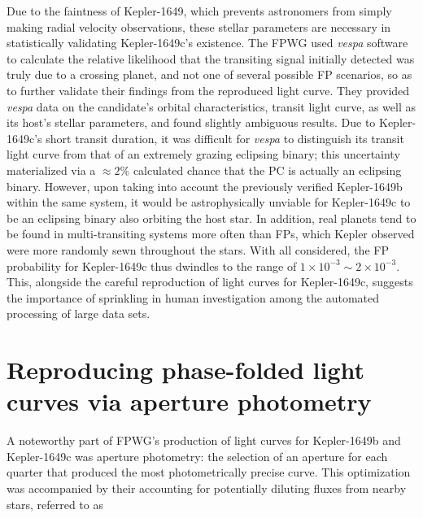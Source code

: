 \documentclass[onecolumn, 12pt]{article}
\begin{document}
Due to the faintness of Kepler-1649, which prevents astronomers from simply making radial velocity observations, these stellar parameters are necessary in statistically validating Kepler-1649c's existence. The FPWG used \textit{vespa} software to calculate the relative likelihood that the transiting signal initially detected was truly due to a crossing planet, and not one of several possible FP scenarios, so as to further validate their findings from the reproduced light curve. They provided \textit{vespa} data on the candidate's orbital characteristics, transit light curve, as well as its host's stellar parameters, and found slightly ambiguous results. Due to Kepler-1649c's short transit duration, it was difficult for \textit{vespa} to distinguish its transit light curve from that of an extremely grazing eclipsing binary; this uncertainty materialized via a $\approx2\%$ calculated chance that the PC is actually an eclipsing binary. However, upon taking into account the previously verified Kepler-1649b within the same system, it would be astrophysically unviable for Kepler-1649c to be an eclipsing binary also orbiting the host star. In addition, real planets tend to be found in multi-transiting systems more often than FPs, which Kepler observed were more randomly sewn throughout the stars. With all considered, the FP probability for Kepler-1649c thus dwindles to the range of $1 \times 10^{-3} \sim 2 \times 10^{-3}$. This, alongside the careful reproduction of light curves for Kepler-1649c, suggests the importance of sprinkling in human investigation among the automated processing of large data sets.

\section{Reproducing phase-folded light curves via aperture photometry}

A noteworthy part of FPWG's production of light curves for Kepler-1649b and Kepler-1649c was aperture photometry: the selection of an aperture for each quarter that produced the most photometrically precise curve. This optimization was accompanied by their accounting for potentially diluting fluxes from nearby stars, referred to as 
\end{document}
